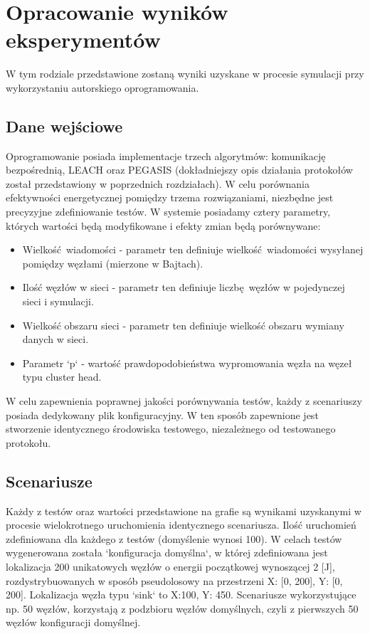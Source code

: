 \documentclass[a4paper,12pt,twoside,openany]{report}
\begin{document}
\chapter{Opracowanie wyników eksperymentów}

W tym rodziale przedstawione zostaną wyniki uzyskane w procesie symulacji przy wykorzystaniu autorskiego oprogramowania.

\section{Dane wejściowe}

Oprogramowanie posiada implementacje trzech algorytmów: komunikację bezpośrednią, LEACH oraz PEGASIS (dokładniejszy opis działania protokołów został przedstawiony w poprzednich rozdziałach).
W celu porównania efektywności energetycznej pomiędzy trzema rozwiązaniami, niezbędne jest precyzyjne zdefiniowanie testów.
W systemie posiadamy cztery parametry, których wartości będą modyfikowane i efekty zmian będą porównywane:

\begin{itemize}
 \item Wielkość wiadomości - parametr ten definiuje wielkość wiadomości wysyłanej pomiędzy węzłami (mierzone w Bajtach).
 \item Ilość węzłów w sieci - parametr ten definiuje liczbę węzłów w pojedynczej sieci i symulacji.
 \item Wielkość obszaru sieci - parametr ten definiuje wielkość obszaru wymiany danych w sieci.
 \item Parametr `p` - wartość prawdopodobieństwa wypromowania węzła na węzeł typu cluster head.
\end{itemize}

W celu zapewnienia poprawnej jakości porównywania testów, każdy z scenariuszy posiada dedykowany plik konfiguracyjny.
W ten sposób zapewnione jest stworzenie identycznego środowiska testowego, niezależnego od testowanego protokołu.

\section{Scenariusze}

Każdy z testów oraz wartości przedstawione na grafie są wynikami uzyskanymi w procesie wielokrotnego uruchomienia identycznego scenariusza. 
Ilość uruchomień zdefiniowana dla każdego z testów (domyślenie wynosi 100).
W celach testów wygenerowana została `konfiguracja domyślna`, w której zdefiniowana jest lokalizacja 200 unikatowych węzłów o energii początkowej wynoszącej 2 [J], 
rozdystrybuowanych w sposób pseudolosowy na przestrzeni X: [0, 200], Y: [0, 200]. Lokalizacja węzła typu `sink` to X:100, Y: 450.
Scenariusze wykorzystujące np. 50 węzłów, korzystają z podzbioru węzłów domyślnych, czyli z pierwszych 50 węzłów konfiguracji domyślnej.
\end{document}
